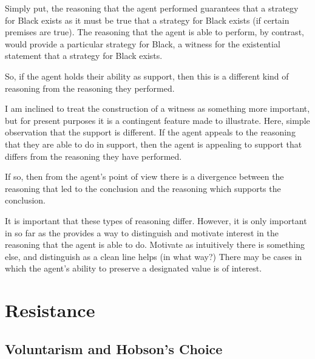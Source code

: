 \documentclass[10pt]{article}
\begin{document}
\begin{note}
  Simply put, the reasoning that the agent performed guarantees that a strategy for Black exists as it must be true that a strategy for Black exists (if certain premises are true).
  The reasoning that the agent is able to perform, by contrast, would provide a particular strategy for Black, a witness for the existential statement that a strategy for Black exists.

  So, if the agent holds their ability as support, then this is a different kind of reasoning from the reasoning they performed.

  I am inclined to treat the construction of a witness as something more important, but for present purposes it is a contingent feature made to illustrate.
  Here, simple observation that the support is different.
  If the agent appeals to the reasoning that they are able to do in support, then the agent is appealing to support that differs from the reasoning they have performed.

  If so, then from the agent's point of view there is a divergence between the reasoning that led to the conclusion and the reasoning which supports the conclusion.

  {
    \color{red}
    It is important that these types of reasoning differ.
    However, it is only important in so far as the provides a way to distinguish and motivate interest in the reasoning that the agent is able to do.
    Motivate as intuitively there is something else, and distinguish as a clean line helps (in what way?)
    There may be cases in which the agent's ability to preserve a designated value is of interest.
  }
\end{note}

\section{Resistance}
\label{sec:resistance}


\subsection{Voluntarism and Hobson's Choice}
\label{sec:non-voluntarism}
\end{document}
